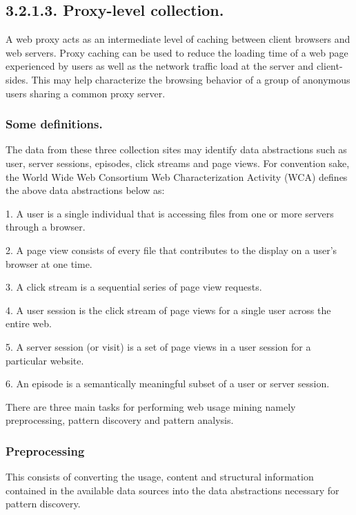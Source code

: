 \documentclass{article}
\begin{document}
\subsection*{\small{3.2.1.3. Proxy-level collection}.}
A web proxy acts as an intermediate level of caching between client browsers and web servers. Proxy caching can be used to reduce the loading time of a web page experienced by users as well as the network traffic load at the server and client-sides. This may help characterize the browsing behavior of a group of anonymous users sharing a common proxy server.

\subsubsection{ Some definitions.}
The data from these three collection sites may identify data abstractions such as user, server sessions, episodes, click streams and page views. For convention sake, the World Wide Web Consortium Web Characterization Activity (WCA) defines the above data abstractions below as: 

1.	A user is a single individual that is accessing files from one or more servers through a browser.

2.	A page view consists of every file that contributes to the display on a user’s browser at one time.

3.	A click stream is a sequential series of page view requests.

4.	A user session is the click stream of page views for a single user across the entire web.

5.	A server session (or visit) is a set of page views in a user session for a particular website.

6.	An episode is a semantically meaningful subset of a user or server session.

There are three main tasks for performing web usage mining namely preprocessing, pattern discovery and pattern analysis.
\subsubsection{ Preprocessing}This consists of converting the usage, content and structural information contained in the available data sources into the data abstractions necessary for pattern discovery.
\end{document}
